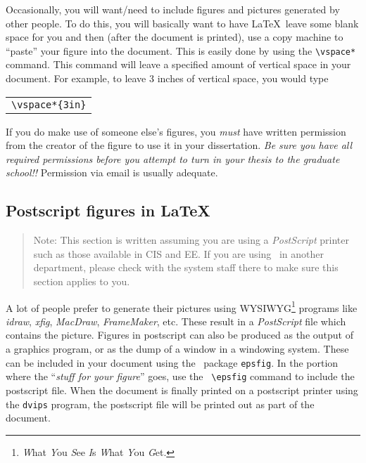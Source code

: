 Occasionally, you will want/need to include figures and pictures
generated by other people.  To do this, you will basically want to
have \LaTeX\ leave some blank space for you and then (after the
document is printed), use a copy machine to ``paste'' your figure into
the document.  This is easily done by using the \verb#\vspace*#
command.  This command will leave a specified amount of vertical space
in your document.  For example, to leave 3 inches of vertical space,
you would type
%
\begin{center}
\begin{tabular}{l}
\verb#\vspace*{3in}#
\end{tabular}
\end{center}
%

If you do make use of someone else's figures, you {\em must} have
written permission from the creator of the figure to use it in your
dissertation.  {\em Be sure you have all required permissions before
you attempt to turn in your thesis to the graduate school!!}
Permission via email is usually adequate.

\subsection{Postscript figures in \LaTeX}
\label{ps-figures}

\begin{quotation}
Note: This section is written assuming you are using a {\em
PostScript} printer such as those available in CIS and EE. If you are using
\LaTeXe\ in another department, please check with the system staff there to make
sure this section applies to you.
\end{quotation}

A lot of people prefer to generate their pictures using
WYSIWYG\footnote{{\em W}hat {\em Y}ou {\em S}ee {\em I}s {\em W}hat {\em
Y}ou {\em G}et.} programs like {\em idraw}, {\em xfig}, {\em MacDraw}, {\em
FrameMaker}, etc. These result in a {\em PostScript} file which contains
the picture. Figures in postscript can also be produced as the output of a
graphics program, or as the dump of a window in a windowing system. These
can be included in your document using the \LaTeXe\ package {\tt epsfig}.
In the portion where the ``{\em stuff for your figure}'' goes, use the {\tt
\verb+\+epsfig} command to include the postscript file.  When the document
is finally printed on a postscript printer using the {\tt dvips} program,
the postscript file will be printed out as part of the document.

